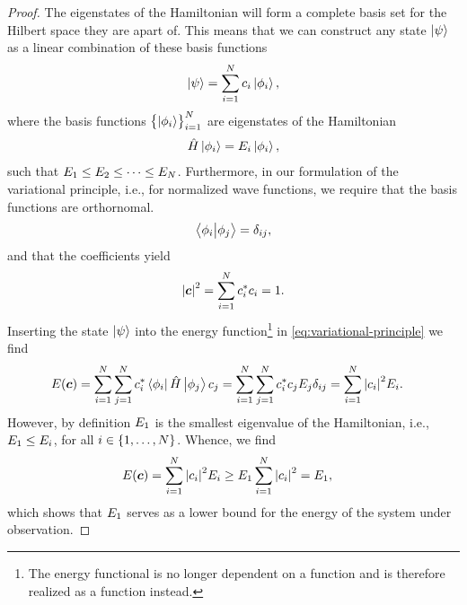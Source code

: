         \begin{proof}
            The eigenstates of the Hamiltonian will form a complete basis set
            for the Hilbert space they are apart of.
            This means that we can construct any state $\ket{\psi}$ as a linear
            combination of these basis functions
            \begin{align}
                \ket{\psi} = \sum_{i = 1}^{N} c_{i}\ket{\phi_i},
            \end{align}
            where the basis functions $\left\{ \ket{\phi_i} \right\}_{i = 1}^{N}$ are
            eigenstates of the Hamiltonian
            \begin{align}
                \hat{H}\ket{\phi_i} = E_i\ket{\phi_i},
            \end{align}
            such that $E_1 \leq E_2 \leq \dots \leq E_N$.
            Furthermore, in our formulation of the variational principle, i.e.,
            for normalized wave functions, we require that the basis functions
            are orthornomal.
            \begin{align}
                \braket{\phi_i}{\phi_j} = \delta_{ij},
            \end{align}
            and that the coefficients yield
            \begin{align}
                \abs{\boldsymbol{c}}^2 = \sum_{i = 1}^{N} c^{*}_{i}c_{i} = 1.
            \end{align}
            Inserting the state $\ket{\psi}$ into the energy
            function\footnote{%
                The energy functional is no longer dependent on a function and
                is therefore realized as a function instead.
            } in \autoref{eq:variational-principle} we find
            \begin{align}
                E(\boldsymbol{c})
                &= \sum_{i = 1}^{N}\sum_{j = 1}^{N}
                c^{*}_i\bra{\phi_i}\hat{H}\ket{\phi_j}c_j
                = \sum_{i = 1}^{N}\sum_{j = 1}^{N}
                c^{*}_i c_j E_j\delta_{ij}
                = \sum_{i = 1}^{N}
                \abs{c_i}^2 E_i.
            \end{align}
            However, by definition $E_1$ is the smallest eigenvalue of the
            Hamiltonian, i.e., $E_1 \leq E_i$, for all $i \in
            \left\{ 1, \dots, N \right\}$.
            Whence, we find
            \begin{align}
                E(\boldsymbol{c})
                &= \sum_{i = 1}^{N}
                \abs{c_i}^2 E_i
                \geq
                E_1 \sum_{i = 1}^{N}
                \abs{c_i}^{2}
                = E_1,
            \end{align}
            which shows that $E_1$ serves as a lower bound for the energy
            of the system under observation.
        \end{proof}

